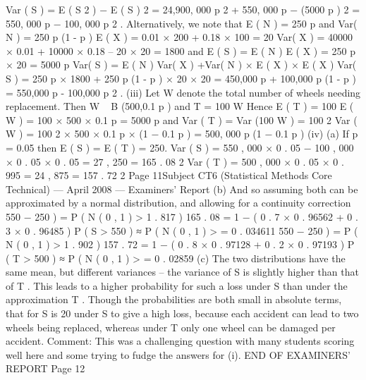 Var ( S ) = E ( S 2 ) − E ( S ) 2 = 24,900, 000 p 2 + 550, 000 p − (5000 p ) 2 = 550, 000 p − 100, 000 p 2 .
Alternatively, we note that
E ( N ) = 250 p and Var( N ) = 250 p (1 - p )
E ( X ) = 0.01 × 200 + 0.18 × 100 = 20
Var( X ) = 40000 × 0.01 + 10000 × 0.18 – 20 × 20 = 1800
and
E ( S ) = E ( N ) E ( X ) = 250 p × 20 = 5000 p
Var( S ) = E ( N ) Var( X ) +Var( N ) × E ( X ) × E ( X )
Var( S ) = 250 p × 1800 + 250 p (1 - p ) × 20 × 20
= 450,000 p + 100,000 p (1 - p ) = 550,000 p - 100,000 p 2 .
(iii)
Let W denote the total number of wheels needing replacement. Then
W ~ B (500,0.1 p ) and T = 100 W
Hence
E ( T ) = 100 E ( W ) = 100 × 500 × 0.1 p = 5000 p
and
Var ( T ) = Var (100 W ) = 100 2 Var ( W ) = 100 2 × 500 × 0.1 p × (1 − 0.1 p )
= 500, 000 p (1 − 0.1 p )
(iv)
(a)
If p = 0.05 then
E ( S ) = E ( T ) = 250.
Var ( S ) = 550 , 000 × 0 . 05 − 100 , 000 × 0 . 05 × 0 . 05 = 27 , 250 = 165 . 08 2
Var ( T ) = 500 , 000 × 0 . 05 × 0 . 995 = 24 , 875 = 157 . 72 2
Page 11Subject CT6 (Statistical Methods Core Technical) — April 2008 — Examiners’ Report
(b)
And so assuming both can be approximated by a normal distribution, and allowing for a continuity correction
550 − 250
) = P ( N ( 0 , 1 ) > 1 . 817 )
165 . 08
= 1 − ( 0 . 7 × 0 . 96562 + 0 . 3 × 0 . 96485 )
P ( S > 550 ) ≈ P ( N ( 0 , 1 ) >
= 0 . 034611
550 − 250
) = P ( N ( 0 , 1 ) > 1 . 902 )
157 . 72
= 1 − ( 0 . 8 × 0 . 97128 + 0 . 2 × 0 . 97193 )
P ( T > 500 ) ≈ P ( N ( 0 , 1 ) >
= 0 . 02859
(c)
The two distributions have the same mean, but different variances – the
variance of S is slightly higher than that of T . This leads to a higher
probability for such a loss under S than under the approximation T .
Though the probabilities are both small in absolute terms, that for S is
20%
under S to give a high loss, because each accident can lead to two
wheels being replaced, whereas under T only one wheel can be
damaged per accident.
Comment: This was a challenging question with many students scoring well here and
some trying to fudge the answers for (i).
END OF EXAMINERS’ REPORT
Page 12
